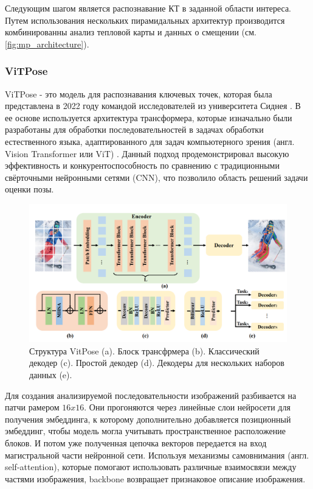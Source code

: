 Следующим шагом является распознавание КТ в заданной области интереса. Путем использования нескольких пирамидальных архитектур производится комбинированны анализ тепловой карты и данных о смещении (см. \autoref{fig:mp_architecture}).

\subsubsection*{ViTPose}

ViTPose - это модель для распознавания ключевых точек, которая была представлена в 2022 году командой исследователей из университета Сиднея \cite{vitpose}. В ее основе используется архитектура трансформера, которые изначально были разработаны для обработки последовательностей в задачах обработки естественного языка, адаптированного для задач компьютерного зрения (англ. Vision Transformer или ViT) \cite{vit}. Данный подход продемонстрировал высокую эффективность и конкурентоспособность по сравнению с традиционными свёрточными нейронными сетями (CNN), что позволило область решений задачи оценки позы.

\begin{figure}[h]
	\centering
	\includegraphics[width=.8\textwidth]{./images/vitpose_structure}
	\caption{Структура VitPose (a). Блоск трансфрмера (b). Классический декодер (c). Простой декодер (d). Декодеры для нескольких наборов данных (e). \cite{vitpose}}
	\label{fig:vitpose_structure}
\end{figure}

Для создания анализируемой последовательности изображений разбивается на патчи рамером $16x16$. Они прогоняются через линейные слои нейросети для получения эмбеддинга, к которому дополнительно добавляется позиционный эмбеддинг, чтобы модель могла учитывать пространственное расположение блоков. И потом уже полученная цепочка векторов передается на вход магистральной части нейронной сети. Используя механизмы самовнимания (англ. self-attention), которые помогают использовать различные взаимосвязи между частями изображения, backbone возвращает признаковое описание изображения.

